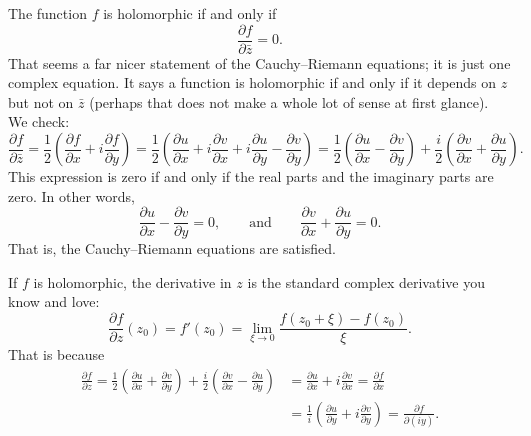 \documentclass[12pt,openany]{book}
\theoremstyle{plain}
\theoremstyle{remark}
\theoremstyle{definition}
\theoremstyle{exercise}
\theoremstyle{example}
\begin{document}
The function $f$ is holomorphic if and only if
\begin{equation*}
\frac{\partial f}{\partial \bar{z}} = 0 .
\end{equation*}
That seems a far nicer statement of the Cauchy--Riemann equations; it is
just one complex equation.  It says
a function is holomorphic if and only if it depends on $z$ but not on
$\bar{z}$ (perhaps that does not make a whole lot of sense at first
glance).
We check:
\begin{equation*}
\frac{\partial f}{\partial \bar{z}}
=
\frac{1}{2}
\left(
\frac{\partial f}{\partial x} + i
\frac{\partial f}{\partial y}
\right)
=
\frac{1}{2}
\left(
\frac{\partial u}{\partial x}
+ i \frac{\partial v}{\partial x}
+ i \frac{\partial u}{\partial y}
- \frac{\partial v}{\partial y}
\right)
=
\frac{1}{2}
\left(
\frac{\partial u}{\partial x}
- \frac{\partial v}{\partial y}
\right)
+
\frac{i}{2}
\left(
\frac{\partial v}{\partial x}
+ \frac{\partial u}{\partial y}
\right) .
\end{equation*}
This expression is zero if and only if the real parts and the imaginary
parts are zero.  In other words, %
\begin{equation*}
\frac{\partial u}{\partial x}
- \frac{\partial v}{\partial y}
= 0,
\qquad
\text{and}
\qquad
\frac{\partial v}{\partial x}
+ \frac{\partial u}{\partial y} = 0
.
\end{equation*}
That is, the Cauchy--Riemann equations are satisfied.

If $f$ is holomorphic, the derivative in $z$ is the standard complex derivative you know and love:
\begin{equation*}
\frac{\partial f}{\partial z} (z_0)
=
f'(z_0)
=
\lim_{\xi \to 0} \frac{f(z_0+\xi)-f(z_0)}{\xi} .
\end{equation*}
That is because
\begin{equation*}
\begin{split}
\frac{\partial f}{\partial z}
=
\frac{1}{2}
\left(
\frac{\partial u}{\partial x}
+ \frac{\partial v}{\partial y}
\right)
+
\frac{i}{2}
\left( \frac{\partial v}{\partial x} - \frac{\partial u}{\partial y}
\right)
& =
\frac{\partial u}{\partial x}
+ i \frac{\partial v}{\partial x}
 =
\frac{\partial f}{\partial x}
\\
& =
\frac{1}{i} \left(
\frac{\partial u}{\partial y}
+ i
\frac{\partial v}{\partial y}
\right)
 =
\frac{\partial f}{\partial (iy)}
.
\end{split}
\end{equation*}
\end{document}
